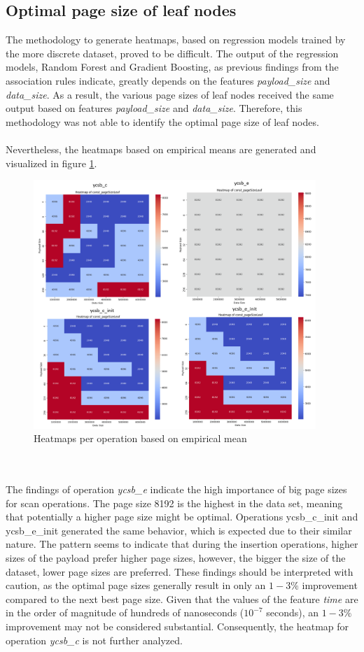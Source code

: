 \subsection{Optimal page size of leaf nodes}
The methodology to generate heatmaps, based on regression models trained by the more discrete dataset, proved to be difficult. The output of the regression models, Random Forest and Gradient Boosting, as previous findings from the association rules indicate, greatly depends on the features \textit{payload\_size} and \textit{data\_size}. As a result, the various page sizes of leaf nodes received the same output based on features \textit{payload\_size} and \textit{data\_size}. Therefore, this methodology was not able to identify the optimal page size of leaf nodes. 
\\\\
Nevertheless, the heatmaps based on empirical means are generated and visualized in figure \ref{fig:heatmaps}.
\begin{figure}[h]
      \centering
      \includegraphics[width=0.95\textwidth]{images/heatmaps.png}
      \caption{Heatmaps per operation based on empirical mean}
      \label{fig:heatmaps}
\end{figure}
\\\\
The findings of operation \textit{ycsb\_e} indicate the high importance of big page sizes for scan operations. The page size 8192 is the highest in the data set, meaning that potentially a higher page size might be optimal. Operations {ycsb\_c\_init} and {ycsb\_e\_init} generated the same behavior, which is expected due to their similar nature. The pattern seems to indicate that during the insertion operations, higher sizes of the payload prefer higher page sizes, however, the bigger the size of the dataset, lower page sizes are preferred. These findings should be interpreted with caution, as the optimal page sizes generally result in only an $1-3\%$ improvement compared to the next best page size. Given that the values of the feature \textit{time} are in the order of magnitude of hundreds of nanoseconds  ($10^{-7}$ seconds), an $1-3\%$ improvement may not be considered substantial. Consequently, the heatmap for operation \textit{ycsb\_c} is not further analyzed. 